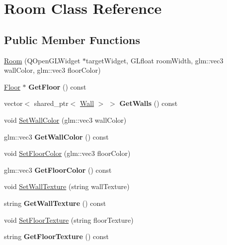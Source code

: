 \hypertarget{class_room}{}\section{Room Class Reference}
\label{class_room}
\subsection*{Public Member Functions}
\begin{DoxyCompactItemize}
\item 
\hyperlink{class_room_a7b347765e9501c064013258629b4de19}{Room} (Q\+Open\+G\+L\+Widget $\ast$target\+Widget, G\+Lfloat room\+Width, glm\+::vec3 wall\+Color, glm\+::vec3 floor\+Color)
\item 
\hypertarget{class_room_ae621e50fd276c68af137ab02666dcee8}{}\hyperlink{class_floor}{Floor} $\ast$ {\bfseries Get\+Floor} () const \label{class_room_ae621e50fd276c68af137ab02666dcee8}

\item 
\hypertarget{class_room_a99f66c521d11492e4699a8f9aca6fa25}{}vector$<$ shared\+\_\+ptr$<$ \hyperlink{class_wall}{Wall} $>$ $>$ {\bfseries Get\+Walls} () const \label{class_room_a99f66c521d11492e4699a8f9aca6fa25}

\item 
void \hyperlink{class_room_a0fee2b31c00e8965934ddb0cba8dab9f}{Set\+Wall\+Color} (glm\+::vec3 wall\+Color)
\item 
\hypertarget{class_room_a4a5c9022582a2acaa29196a45c864e6c}{}glm\+::vec3 {\bfseries Get\+Wall\+Color} () const \label{class_room_a4a5c9022582a2acaa29196a45c864e6c}

\item 
void \hyperlink{class_room_a47df29040992bde5444c485b0b942aad}{Set\+Floor\+Color} (glm\+::vec3 floor\+Color)
\item 
\hypertarget{class_room_a92d642a94fd6a2b65094501e17559b48}{}glm\+::vec3 {\bfseries Get\+Floor\+Color} () const \label{class_room_a92d642a94fd6a2b65094501e17559b48}

\item 
void \hyperlink{class_room_ab0f733f37df1351b30573dcc8e13a18d}{Set\+Wall\+Texture} (string wall\+Texture)
\item 
\hypertarget{class_room_a9767bef2a8361a6654d77d522bee77e7}{}string {\bfseries Get\+Wall\+Texture} () const \label{class_room_a9767bef2a8361a6654d77d522bee77e7}

\item 
void \hyperlink{class_room_af6104c7b967af777bc8b054179f43829}{Set\+Floor\+Texture} (string floor\+Texture)
\item 
\hypertarget{class_room_a604d2069548456e15fc537b56900a4e0}{}string {\bfseries Get\+Floor\+Texture} () const \label{class_room_a604d2069548456e15fc537b56900a4e0}


\end{DoxyCompactItemize}
